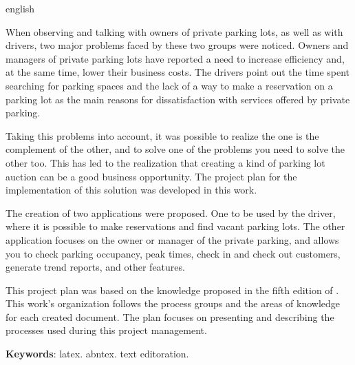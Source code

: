 \begin{resumo}[Abstract]
 \begin{otherlanguage*}{english}
   
   When observing and talking with owners of private parking lots, as well as with drivers, two major problems faced by these two groups were noticed. Owners and managers of private parking lots have reported a need to increase efficiency and, at the same time, lower their business costs. The drivers point out the time spent searching for parking spaces and the lack of a way to make a reservation on a parking lot as the main reasons for dissatisfaction with services offered by private parking.

   Taking this problems into account, it was possible to realize the one is the complement of the other, and to solve one of the problems you need to solve the other too. This has led to the realization that creating a kind of parking lot auction can be a good business opportunity. The project plan for the implementation of this solution was developed in this work.

   The creation of two applications were proposed. One to be used by the driver, where it is possible to make reservations and find vacant parking lots. The other application focuses on the owner or manager of the private parking, and allows you to check parking occupancy, peak times, check in and check out customers, generate trend reports, and other features.

   This project plan was based on the knowledge proposed in the fifth edition of \cite{project2013guia}. This work's organization follows the process groups and the areas of knowledge for each created document. The plan focuses on presenting and describing the processes used during this project management.

   \vspace{\onelineskip}
 
   \noindent 
   \textbf{Keywords}: latex. abntex. text editoration.
 \end{otherlanguage*}
\end{resumo}